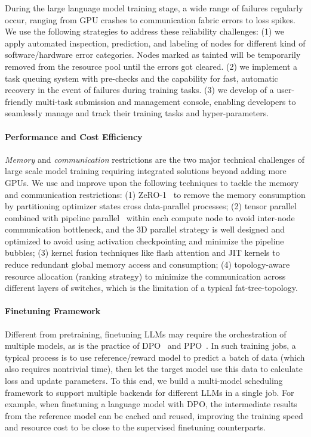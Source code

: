 \documentclass[numbers,sort&compress]{article}
\begin{document}
During the large language model training stage, a wide range of failures regularly occur, ranging from GPU crashes to communication fabric errors to loss spikes. We use the following strategies to address these reliability challenges:
(1) we apply automated inspection, prediction, and labeling of nodes for different kind of software/hardware error categories. Nodes marked as tainted will be temporarily removed from the resource pool until the errors got cleared. 
(2) we implement a task queuing system with pre-checks and the capability for fast, automatic recovery in the event of failures during training tasks. 
(3) we develop of a user-friendly multi-task submission and management console, enabling developers to seamlessly manage and track their training tasks and hyper-parameters.

\paragraph{Performance and Cost Efficiency} \textit{Memory} and \textit{communication} restrictions are the two major technical challenges of large scale model training requiring integrated solutions beyond adding more GPUs.
We use and improve upon the following techniques to tackle the memory and communication restrictions: (1) ZeRO-1~\cite{zero} to remove the memory consumption by partitioning optimizer states cross data-parallel processes; (2) tensor parallel combined with pipeline parallel~\cite{megatron-lm} within each compute node to avoid inter-node communication bottleneck, and the 3D parallel strategy is well designed and optimized to avoid using activation checkpointing and minimize the pipeline bubbles; (3) kernel fusion techniques like flash attention\cite{dao2022flashattention}\cite{dao2023flashattention2} and JIT kernels to reduce redundant global memory access and consumption; (4) topology-aware resource allocation (ranking strategy) to minimize the communication across different layers of switches, which is the limitation of a typical fat-tree-topology. 

\paragraph{Finetuning Framework}
Different from pretraining, finetuning LLMs may require the orchestration of multiple models, as is the practice of DPO~\citep{rafailov2023direct} and PPO~\citep{ouyang2022training}.
In such training jobs, a typical process is to use reference/reward model to predict a batch of data (which also requires nontrivial time), then let the target model use this data to calculate loss and update parameters. 
To this end, we build a multi-model scheduling framework to support multiple backends for different LLMs in a single job. For example, when finetuning a language model with DPO, the intermediate results from the reference model can be cached and reused, improving the training speed and resource cost to be close to the supervised finetuning counterparts. 
\end{document}
